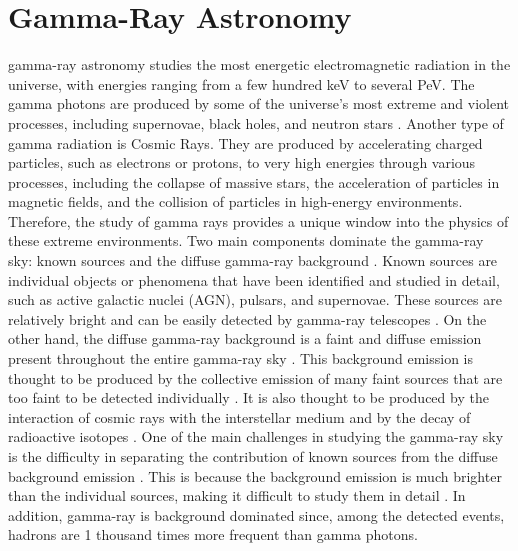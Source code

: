 \section{Gamma-Ray Astronomy}
\label{s:Gamma-Ray-Astronomy}
gamma-ray astronomy studies the most energetic electromagnetic radiation in the universe, with energies ranging from a few hundred keV to several PeV. The gamma photons are produced by some of the universe's most extreme and violent processes, including supernovae, black holes, and neutron stars \cite{Fishman1995}. Another type of gamma radiation is Cosmic Rays. They are produced by accelerating charged particles, such as electrons or protons, to very high energies through various processes, including the collapse of massive stars, the acceleration of particles in magnetic fields, and the collision of particles in high-energy environments. Therefore, the study of gamma rays provides a unique window into the physics of these extreme environments.
Two main components dominate the gamma-ray sky: known sources and the diffuse gamma-ray background \cite{Ackermann2015}. Known sources are individual objects or phenomena that have been identified and studied in detail, such as active galactic nuclei (AGN), pulsars, and supernovae. These sources are relatively bright and can be easily detected by gamma-ray telescopes \cite{Abdo2010}.
On the other hand, the diffuse gamma-ray background is a faint and diffuse emission present throughout the entire gamma-ray sky \cite{Ackermann2015}. This background emission is thought to be produced by the collective emission of many faint sources that are too faint to be detected individually \cite{Abdo2010}. It is also thought to be produced by the interaction of cosmic rays with the interstellar medium and by the decay of radioactive isotopes \cite{bulgarelli_2019}.
One of the main challenges in studying the gamma-ray sky is the difficulty in separating the contribution of known sources from the diffuse background emission \cite{Ackermann2015}. This is because the background emission is much brighter than the individual sources, making it difficult to study them in detail \cite{Abdo2010}. In addition, gamma-ray is background dominated since, among the detected events, hadrons are 1 thousand times more frequent than gamma photons.
